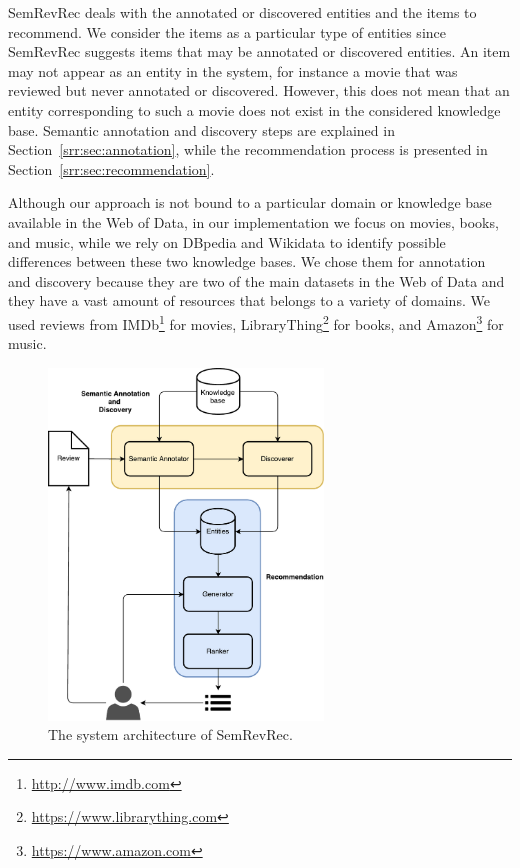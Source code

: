 SemRevRec deals with the annotated or discovered entities and the items to recommend. We consider the items as a particular type of entities since SemRevRec suggests items that may be annotated or discovered entities. An item may not appear as an entity in the system, for instance a movie that was reviewed but never annotated or discovered. However, this does not mean that an entity corresponding to such a movie does not exist in the considered knowledge base. Semantic annotation and discovery steps are explained in Section~\ref{srr:sec:annotation}, while the recommendation process is presented in Section~\ref{srr:sec:recommendation}.

Although our approach is not bound to a particular domain or knowledge base available in the Web of Data, in our implementation we focus on movies, books, and music, while we rely on DBpedia and Wikidata to identify possible differences between these two knowledge bases. We chose them for annotation and discovery because they are two of the main datasets in the Web of Data and they have a vast amount of resources that belongs to a variety of domains. We used reviews from IMDb\footnote{\url{http://www.imdb.com}} for movies, LibraryThing\footnote{\url{https://www.librarything.com}} for books, and Amazon\footnote{\url{https://www.amazon.com}} for music.

\begin{figure}
\centering
\includegraphics[width=0.65\textwidth]{architecture}
\caption[SemRevRec architecture]{The system architecture of SemRevRec.}
\label{srr:fig:arch}
\end{figure}

